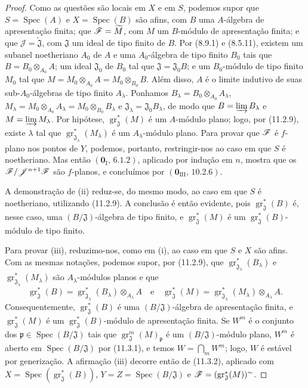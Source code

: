 \begin{proof}
Como as questões são locais em $X$ e em $S$, podemos supor que
$S=\operatorname{Spec}(A)$ e $X=\operatorname{Spec}(B)$ são afins,
com $B$ uma $A$-álgebra de apresentação finita; que
$\mathscr{F}=\widetilde M$, com $M$ um $B$-módulo de apresentação
finita; e que $\mathcal J=\widetilde{\mathfrak J}$, com
$\mathfrak J$ um ideal de tipo finito de $B$.
Por (8.9.1) e (8.5.11), existem um subanel noetheriano $A_0$
de $A$ e uma $A_0$-álgebra de tipo finito $B_0$ tais que
$B=B_0\otimes_{A_0}A$; um ideal $\mathfrak J_0$ de $B_0$
tal que $\mathfrak J=\mathfrak J_0B$; e um $B_0$-módulo de
tipo finito $M_0$ tal que
$M=M_0\otimes_{A_0}A=M_0\otimes_{B_0}B$.
Além disso, $A$ é o limite indutivo de suas sub-$A_0$-álgebras
de tipo finito $A_\lambda$. Ponhamos
$B_\lambda=B_0\otimes_{A_0}A_\lambda$,
$M_\lambda=M_0\otimes_{A_0}A_\lambda
=M_0\otimes_{B_0}B_\lambda$ e
$\mathfrak J_\lambda=\mathfrak J_0B_\lambda$,
de modo que $B=\varinjlim B_\lambda$ e
$M=\varinjlim M_\lambda$.
Por hipótese, $\operatorname{gr}_{\mathfrak J}^*(M)$ é um
$A$-módulo plano; logo, por (11.2.9), existe $\lambda$ tal que
$\operatorname{gr}_{\mathfrak J_\lambda}^*(M_\lambda)$ é um
$A_\lambda$-módulo plano. Para provar que $\mathscr{F}$ é $f$-plano
nos pontos de $Y$, podemos, portanto, restringir-nos ao caso em
que $S$ é noetheriano. Mas então
$(\mathbf 0_{\mathrm I},\,6.1.2)$, aplicado por indução em $n$,
mostra que os $\mathscr{F}/\mathscr J^{n+1}\mathscr{F}$ são $f$-planos,
e concluímos por $(\mathbf 0_{\mathrm{III}},\,10.2.6)$.


A demonstração de (ii) reduz-se, do mesmo modo, ao caso em que
$S$ é noetheriano, utilizando (11.2.9). A conclusão é então
evidente, pois $\operatorname{gr}_{\mathfrak J}^*(B)$ é, nesse caso,
uma $(B/\mathfrak J)$-álgebra de tipo finito, e
$\operatorname{gr}_{\mathfrak J}^*(M)$ é um
$\operatorname{gr}_{\mathfrak J}^*(B)$-módulo de tipo finito.

Para provar (iii), reduzimo-nos, como em (i), ao caso em que
$S$ e $X$ são afins. Com as mesmas notações, podemos supor, por
(11.2.9), que $\operatorname{gr}_{\mathfrak J_\lambda}^*(B_\lambda)$
e $\operatorname{gr}_{\mathfrak J_\lambda}^*(M_\lambda)$ são
$A_\lambda$-módulos planos e que
\[
\operatorname{gr}_{\mathfrak J}^*(B)
=\operatorname{gr}_{\mathfrak J_\lambda}^*(B_\lambda)
\otimes_{A_\lambda}A
\quad\text{e}\quad
\operatorname{gr}_{\mathfrak J}^*(M)
=\operatorname{gr}_{\mathfrak J_\lambda}^*(M_\lambda)
\otimes_{A_\lambda}A.
\]
Consequentemente, $\operatorname{gr}_{\mathfrak J}^*(B)$ é uma
$(B/\mathfrak J)$-álgebra de apresentação finita, e
$\operatorname{gr}_{\mathfrak J}^*(M)$ é um
$\operatorname{gr}_{\mathfrak J}^*(B)$-módulo de apresentação
finita. Se $W^m$ é o conjunto dos
$\mathfrak p\in\operatorname{Spec}(B/\mathfrak J)$ tais que
$\operatorname{gr}_{\mathfrak J}^m(M)_{\mathfrak p}$ é um
$(B/\mathfrak J)$-módulo plano, $W^m$ é aberto em
$\operatorname{Spec}(B/\mathfrak J)$ por (11.3.1), e temos
$W=\bigcap_mW^m$; logo, $W$ é estável por generização.
A afirmação (iii) decorre então de (11.3.2), aplicado com
$X=\operatorname{Spec}(\operatorname{gr}_{\mathfrak J}^*(B))$,
$Y=Z=\operatorname{Spec}(B/\mathfrak J)$ e
$\mathscr{F}=(\operatorname{gr}_{\mathfrak J}^*(M))^{\sim}$.


\end{proof}
